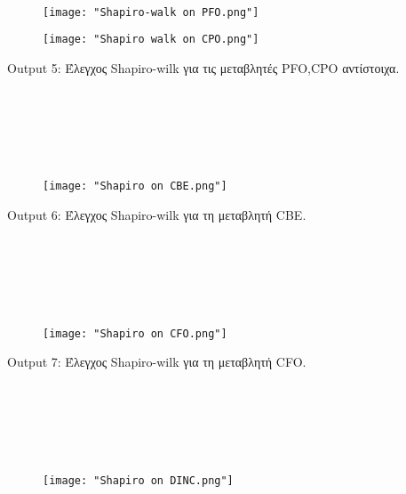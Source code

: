 \documentclass[10pt]{article}
\begin{document}
\

\

\

\begin{figure}[H]
    \centering
    \texttt{[image: "Shapiro-walk on PFO.png"]}
    
    \label{fig:galaxy}
\end{figure}

\begin{figure}[H]
    \centering
    \texttt{[image: "Shapiro walk on CPO.png"]}
    
    \label{fig:galaxy}
\end{figure}

\begin{centering}

\renewcommand{\caption}{Output 5: }
\caption {Έλεγχος Shapiro-wilk για τις μεταβλητές PFO,CPO αντίστοιχα. }
\end{centering}
\

\

\

\begin{figure}[H]
    \centering
    \texttt{[image: "Shapiro on CBE.png"]}
    
    \label{fig:galaxy}
\end{figure}

\begin{centering}

\renewcommand{\caption}{Output 6: }
\caption {Έλεγχος Shapiro-wilk για τη μεταβλητή CBE. }
\end{centering}

\

\

\

\begin{figure}[H]
    \centering
    \texttt{[image: "Shapiro on CFO.png"]}
    
    \label{fig:galaxy}
\end{figure}

\begin{centering}

\renewcommand{\caption}{Output 7: }
\caption {Έλεγχος Shapiro-wilk για τη μεταβλητή CFO. }
\end{centering}

\

\

\

\begin{figure}[H]
    \centering
    \texttt{[image: "Shapiro on DINC.png"]}
    
    \label{fig:galaxy}
\end{figure}
\end{document}

